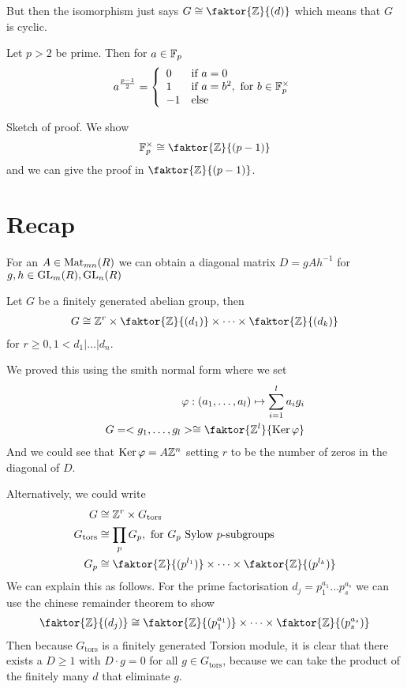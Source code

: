 But then the isomorphism just says $G \iso \faktor{\Z}{(d)}$ which means that $G$ is cyclic.


\begin{corollary}[]
Let $p > 2$ be prime. Then for $a \in \mathbb{F}_p$
\begin{align*}
	a^{\frac{p-1}{2}} = \left\{\begin{array}{ll}
			0 & \text{if } a = 0 \\
		 1& \text{if } a = b^{2}, \text{ for } b \in \mathbb{F}_p^{\times}\\
		 -1 & \text{else}
	\end{array} \right.
\end{align*}
\end{corollary}
Sketch of proof. We show
\begin{align*}
	\F_p^{\times} \iso \faktor{\Z}{(p-1)}
\end{align*}
and we can give the proof in $\faktor{\Z}{(p-1)}$.


\section*{Recap}
\begin{theorem}
	For an $A \in \operatorname{Mat}_{mn}(R)$ we can obtain a diagonal matrix $D = gAh^{-1}$ for $g,h \in \operatorname{GL}_m(R), \operatorname{GL}_n(R)$ 
\end{theorem}
\begin{theorem}[]
	Let $G$ be a finitely generated abelian group, then
	\begin{align*}
		G \iso \Z^{r} \times \faktor{\Z}{(d_1)} \times \dots \times \faktor{\Z}{(d_k)}
	\end{align*}
	for $r \geq 0, 1 < d_1|\dots|d_n$.
\end{theorem}
We proved this using the smith normal form where we set
\begin{align*}
	\phi: (a_{1}, \ldots, a_{l}) \mapsto \sum_{i=1}^{l}a_ig_i\\
	G = <g_1, \ldots, g_l> \iso \faktor{\Z^{l}}{\Ker \phi}
\end{align*}
And we could see that $\operatorname{Ker} \varphi = A \mathbb{Z}^{n}$ setting $r$ to be the number of zeros in the diagonal of $D$.


Alternatively, we could write
\begin{align*}
	G &\iso \Z^{r} \times G_{\text{tors}}\\
	G_{\text{tors}} &\iso \prod_{p}G_p, \text{ for $G_p$ Sylow $p$-subgroups}\\
	G_p &\iso \faktor{\Z}{(p^{l_1})} \times \dots \times \faktor{\Z}{(p^{l_k})}
\end{align*}
We can explain this as follows. For the prime factorisation $d_j = p_1^{a_1}\dots p_s^{a_s}$ we can use the chinese remainder theorem to show
\begin{align*}
	\faktor{\Z}{(d_j)} \iso \faktor{\Z}{(p_1^{a_1})} \times \dots \times \faktor{\Z}{(p_s^{a_s})}
\end{align*}
Then because $G_{\text{tors}}$ is a finitely generated Torsion module, it is clear that there exists a $D \geq 1$ with $D \cdot g = 0$ for all $g \in G_{\text{tors}}$, because we can take the product of the finitely many $d$ that eliminate $g$.

